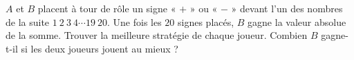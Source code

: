 $A$ et $B$ placent à tour de rôle un signe « $+$ » ou « $-$ » devant l'un des nombres de la suite $1\ 2\ 3\ 4 \cdots 19\ 20$. Une fois les $20$ signes placés, $B$ gagne la valeur absolue de la somme. Trouver la meilleure stratégie de chaque joueur. Combien $B$ gagne-t-il si les deux joueurs jouent au mieux ?
